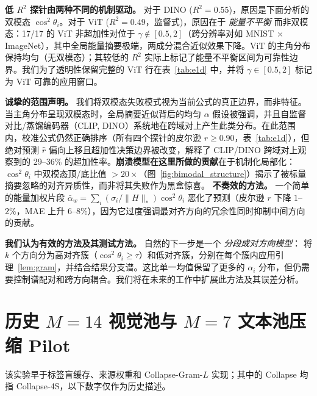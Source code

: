 \documentclass{article}
\begin{document}
\textbf{低 $R^2$ 探针由两种不同的机制驱动。} 对于 DINO ($R^2{=}0.55$)，原因是下面分析的双模态 $\cos^2\theta_i$。对于 ViT ($R^2{=}0.49$，监督式)，原因在于 \emph{能量不平衡} 而非双模态：17/17 的 ViT 非超加性对位于 $\gamma{\notin}[0.5,2]$（跨分辨率对如 MNIST $\times$ ImageNet），其中全局能量摘要极端，两成分混合近似效果下降。ViT 的主角分布保持均匀（无双模态）；其较低的 $R^2$ 实际上标记了能量不平衡区间为可靠性边界。我们为了透明性保留完整的 ViT 行在表~\ref{tab:e1d} 中，并将 $\gamma{\in}[0.5,2]$ 标记为 ViT 可靠的应用窗口。

\textbf{诚挚的范围声明。} 我们将双模态失败模式视为当前公式的真正边界，而非特征。当主角分布呈现双模态时，全局摘要近似背后的均匀 $\alpha$ 假设被强调，并且自监督对比/蒸馏编码器（CLIP, DINO）系统地在跨域对上产生此类分布。在此范围内，校准公式仍然正确排序（所有四个探针的皮尔逊 $r{\geq}0.90$，表~\ref{tab:e1d}），但绝对预测 $\hat r$ 偏向上移且超加性决策边界被改变，解释了 CLIP/DINO 跨域对上观察到的 29--36\% 的超加性率。\textbf{崩溃模型在这里所做的贡献}在于机制化局部化：$\cos^2\theta_i$ 中双模态顶/底比值 ${>}20{\times}$（图~\ref{fig:bimodal_structure}）揭示了被标量摘要忽略的对齐异质性，而非将其失败作为黑盒惊喜。
\textbf{不奏效的方法。}
一个简单的能量加权片段
$\bar\alpha_w{=}\sum_i(\sigma_i/\|H\|_*)\cos^2\theta_i$
恶化了预测（皮尔逊 $r$ 下降 $1$--$2\%$，MAE 上升 $6$--$8\%$），因为它过度强调最对齐方向的冗余性同时抑制中间方向的贡献。

\textbf{我们认为有效的方法及其测试方法。}
自然的下一步是一个 \emph{分段成对方向模型}：
将 $k$ 个方向分为高对齐簇（$\cos^2\theta_i{\geq}\tau$）和低对齐簇，分别在每个簇内应用引理~\ref{lem:gram}，并结合结果分支谱。这比单一均值保留了更多的 $\alpha_i$ 分布，但仍需要控制谱配对和跨方向耦合。我们将在未来的工作中扩展此方法及其误差分析。

\section{历史 $M{=}14$ 视觉池与 $M{=}7$ 文本池压缩 Pilot}
\label{app:compression_m14}

该实验早于标签盲缓存、来源权重和 Collapse-Gram-$L$ 实现；其中的 Collapse 均指 Collapse-4S，以下数字仅作为历史描述。
\end{document}
